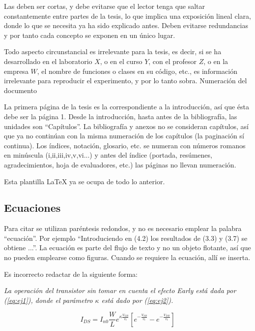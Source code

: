 Las  deben ser cortas, y debe evitarse que el lector tenga que saltar
constantemente entre partes de la tesis, lo que implica una exposición lineal
clara, donde lo que se necesita ya ha sido explicado antes. Deben evitarse
redundancias y por tanto cada concepto se exponen en un único lugar.

Todo aspecto circunstancial es irrelevante para la tesis, es decir, si se ha
desarrollado en el laboratorio $X$, o en el curso $Y$, con el profesor $Z$, o
en la empresa $W$, el nombre de funciones o clases en su código, etc., es
información irrelevante para reproducir el experimento, y por lo tanto sobra.
Numeración del documento

La primera página de la tesis es la correspondiente a la introducción, así que
ésta debe ser la página 1. Desde la introducción, hasta antes de la
bibliografía, las unidades son ``Capítulos''. La bibliografía y anexos no se
consideran capítulos, así que ya no continúan con la misma numeración de los
capítulos (la paginación sí continua). Los índices, notación, glosario, etc. se
numeran con números romanos en minúscula (i,ii,iii,iv,v,vi...) y antes del
índice (portada, resúmenes, agradecimientos, hoja de evaluadores, etc.) las
páginas no llevan numeración. 

Esta plantilla LaTeX ya se ocupa de todo lo anterior.

\subsection{Ecuaciones}

Para citar  se utilizan paréntesis redondos, y no es necesario
emplear la palabra ``ecuación''. Por ejemplo ``Introduciendo en (4.2) los
resultados de (3.3) y (3.7) se obtiene ...''. La ecuación es parte del flujo de
texto y no un objeto flotante, así que no pueden emplearse como figuras. Cuando
se requiere la ecuación, allí se inserta.  

Es incorrecto redactar de la siguiente forma: 

\textsl{La operación del transistor sin tomar en cuenta el efecto Early está
  dada por (\ref{eq:ej1}), donde el parámetro $\kappa$ está dado por
  (\ref{eq:ej2}).}

\begin{equation} \label{eq:ej1}
  I_{DS}
  =
  I_{n0} \frac{W}{L}e^{\kappa \frac{V_{GB}}{v_t}}
  \left[
    e^{-\frac{V_{SB}}{v_t}}
    -
    e^{-\frac{V_{DB}}{v_t}}
  \right]
\end{equation}

